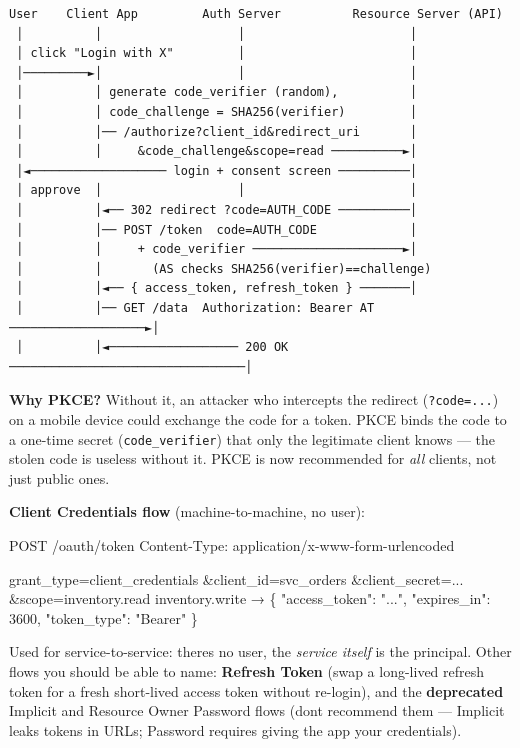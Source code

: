 \documentclass[11pt]{article}
\newenvironment{Shaded}{\begin{snugshade}}{\end{snugshade}}
\newcommand{\NormalTok}[1]{\textcolor[rgb]{0.81,0.81,0.76}{#1}}
\begin{document}
\begin{verbatim}
User    Client App         Auth Server          Resource Server (API)
 │          │                   │                       │
 │ click "Login with X"         │                       │
 │─────────►│                   │                       │
 │          │ generate code_verifier (random),          │
 │          │ code_challenge = SHA256(verifier)         │
 │          │── /authorize?client_id&redirect_uri       │
 │          │     &code_challenge&scope=read ──────────►│
 │◄─────────────────── login + consent screen ──────────│
 │ approve  │                   │                       │
 │          │◄── 302 redirect ?code=AUTH_CODE ──────────│
 │          │── POST /token  code=AUTH_CODE             │
 │          │     + code_verifier ─────────────────────►│
 │          │       (AS checks SHA256(verifier)==challenge)
 │          │◄── { access_token, refresh_token } ───────│
 │          │── GET /data  Authorization: Bearer AT ───────────────────►│
 │          │◄────────────────── 200 OK ─────────────────────────────────│
\end{verbatim}

\textbf{Why PKCE?} Without it, an attacker who intercepts the redirect (\texttt{?code=...}) on a mobile device could exchange the code for a token. PKCE binds the code to a one-time secret (\texttt{code\_verifier}) that only the legitimate client knows --- the stolen code is useless without it. PKCE is now recommended for \emph{all} clients, not just public ones.

\textbf{Client Credentials flow} (machine-to-machine, no user):


\begin{Shaded}
\begin{Highlighting}[]
\NormalTok{POST /oauth/token}
\NormalTok{Content{-}Type: application/x{-}www{-}form{-}urlencoded}

\NormalTok{grant\_type=client\_credentials}
\NormalTok{\&client\_id=svc\_orders}
\NormalTok{\&client\_secret=...}
\NormalTok{\&scope=inventory.read inventory.write}
\NormalTok{→ \{ "access\_token": "...", "expires\_in": 3600, "token\_type": "Bearer" \}}
\end{Highlighting}
\end{Shaded}

Used for service-to-service: there\textquotesingle s no user, the \emph{service itself} is the principal. Other flows you should be able to name: \textbf{Refresh Token} (swap a long-lived refresh token for a fresh short-lived access token without re-login), and the \textbf{deprecated} Implicit and Resource Owner Password flows (don\textquotesingle t recommend them --- Implicit leaks tokens in URLs; Password requires giving the app your credentials).
\end{document}

